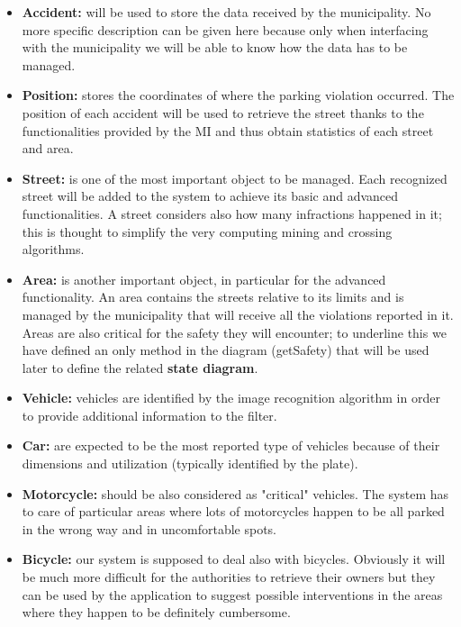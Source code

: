 \begin{itemize}
		\item \textbf{Accident:} will be used to store the data received by the municipality. No more specific description can be given here because only when interfacing with the municipality we will be able to know how the data has to be managed.
		
		\item \textbf{Position:} stores the coordinates of where the parking violation occurred. The position of each accident will be used to retrieve the street thanks to the functionalities provided by the MI and thus obtain statistics of each street and area.
		
		\item \textbf{Street:} is one of the most important object to be managed. Each recognized street will be added to the system to achieve its basic and advanced functionalities. A street considers also how many infractions happened in it; this is thought to simplify the very computing mining and crossing algorithms.
		
		\item \textbf{Area:} is another important object, in particular for the advanced functionality. An area contains the streets relative to its limits and is managed by the municipality that will receive all the violations reported in it. Areas are also critical for the safety they will encounter; to underline this we have defined an only method in the diagram (getSafety) that will be used later to define the related \textbf{state diagram}.
		
		\item \textbf{Vehicle:} vehicles are identified by the image recognition algorithm in order to provide additional information to the filter.
		 
		\item \textbf{Car:} are expected to be the most reported type of vehicles because of their dimensions and utilization (typically identified by the plate).
		
		\item \textbf{Motorcycle:} should be also considered as "critical" vehicles. The system has to care of particular areas where lots of motorcycles happen to be all parked in the wrong way and in uncomfortable spots.
		
		\item \textbf{Bicycle:} our system is supposed to deal also with bicycles. Obviously it will be much more difficult for the authorities to retrieve their owners but they can be used by the application to suggest possible interventions in the areas where they happen to be definitely cumbersome.
		

\end{itemize}
